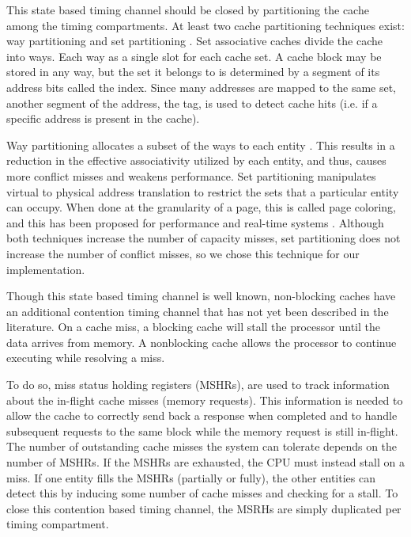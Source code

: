 This state based timing channel should be closed by partitioning the cache 
among the timing compartments. At least two cache partitioning techniques 
exist: way partitioning and set partitioning 
\cite{rtas_cache_framework,dynamic_partitioning}. Set associative caches divide 
the cache into ways. Each way as a single slot for each cache set. A cache 
block may be stored in any way, but the set it belongs to is determined by a 
segment of its address bits called the index. Since many addresses are mapped 
to the same set, another segment of the address, the tag, is used to detect 
cache hits (i.e. if a specific address is present in the cache).

Way partitioning allocates a subset of the ways to each entity 
\cite{citation_needed}. This results in a reduction in the effective 
associativity utilized by each entity, and thus, causes more conflict misses 
and weakens performance. Set partitioning manipulates virtual to physical 
address translation to restrict the sets that a particular entity can occupy.  
When done at the granularity of a page, this is called page coloring, and this 
has been proposed for performance \cite{citation_needed} and real-time systems 
\cite{rtas_cache_framework}.  Although both techniques increase the number of 
capacity misses, set partitioning does not increase the number of conflict 
misses, so we chose this technique for our implementation.

Though this state based timing channel is well known, non-blocking caches have 
an additional contention timing channel that has not yet been described in the 
literature. On a cache miss, a blocking cache will stall the processor until 
the data arrives from memory. A nonblocking cache allows the processor to 
continue executing while resolving a miss.

To do so, miss status holding registers (MSHRs), are used to track information 
about the in-flight cache misses (memory requests). This information is  needed 
to allow the cache to correctly send back a response when completed and to 
handle subsequent requests to the same block while the memory request is still 
in-flight.
The number of outstanding cache misses the system can tolerate depends on the 
number of MSHRs. If the MSHRs are exhausted, the CPU must instead stall on a 
miss. If one entity fills the MSHRs (partially or fully), the other entities 
can detect this by inducing some number of cache misses and checking for a 
stall. To close this contention based timing channel, the MSRHs are simply 
duplicated per timing compartment.

